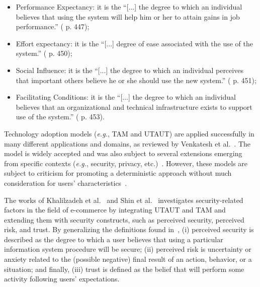 \begin{itemize}
\item Performance Expectancy: it is the ``[...] the degree to which an individual believes that using the system will help him or her to attain gains in job performance.'' (\cite{10.2307/30036540} p. 447);
\item Effort expectancy: it is the ``[...] degree of ease associated with the use of the system.'' (\cite{10.2307/30036540} p. 450);
\item Social Influence: it is the ``[...] the degree to which an individual perceives that important others believe he or she should use the new system.'' (\cite{10.2307/30036540} p. 451);
\item Facilitating Conditions: it is the ``[...] the degree to which an individual believes that an organizational and technical infrastructure exists to support use of the system.'' (\cite{10.2307/30036540} p. 453).
\end{itemize}

\vspace{0.00mm}

Technology adoption models ({\it e.g.}, TAM and UTAUT) are applied successfully in many different applications and domains, as reviewed by Venkatesh et al.~\cite{venkatesh2016unified}.
The model is widely accepted and was also subject to several extensions emerging from specific contexts ({\it e.g.}, security, privacy, etc.)~\cite{MCGLYNN201733}.
However, these models are subject to criticism for promoting a deterministic approach without much consideration for users’ characteristics~\cite{https://doi.org/10.1002/mar.20823}.

The works of Khalilzadeh et al.~\cite{KHALILZADEH2017460} and Shin et al.~\cite{SHIN20091343} investigates security-related factors in the field of e-commerce by integrating UTAUT and TAM and extending them with security constructs, such as perceived security, perceived risk, and trust.
By generalizing the definitions found in~\cite{KHALILZADEH2017460, mandrik2005exploring, SHIN20091343}, (i) perceived security is described as the degree to which a user believes that using a particular information system procedure will be secure; (ii) perceived risk is uncertainty or anxiety related to the (possible negative) final result of an action, behavior, or a situation; and finally, (iii) trust is defined as the belief that will perform some activity following users’ expectations.

